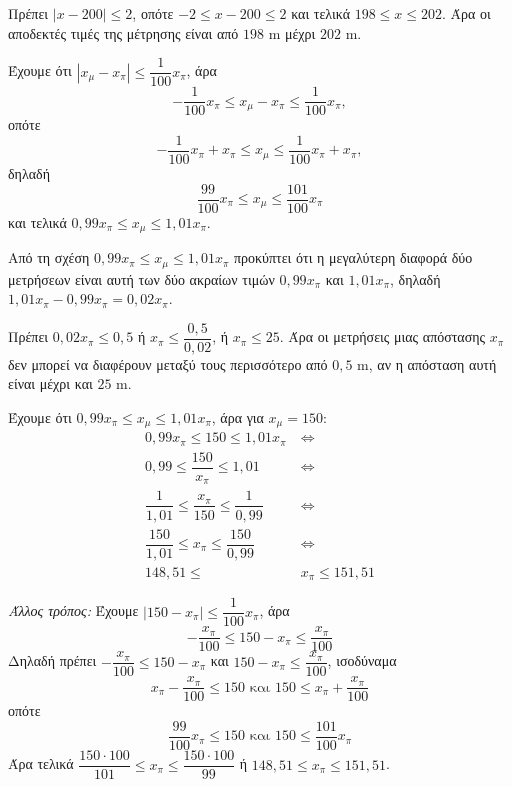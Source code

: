 
\begin{alist}
\item Πρέπει $|x - 200| \le 2$, οπότε $-2 \le x - 200 \le 2$ και τελικά
$198 \le x \le 202$. Άρα οι αποδεκτές τιμές της μέτρησης είναι από $198\text{ m}$ μέχρι $202\text{ m}$.

\item
\begin{rlist}
\item Έχουμε ότι
$|x_\mu - x_\pi| \le \dfrac{1}{100} x_\pi$,
άρα
\[-\dfrac{1}{100} x_\pi \le x_\mu - x_\pi \le \dfrac{1}{100} x_\pi,\]
οπότε
\[-\dfrac{1}{100} x_\pi + x_\pi \le x_\mu \le \dfrac{1}{100} x_\pi + x_\pi,\]
δηλαδή
\[\dfrac{99}{100} x_\pi \le x_\mu \le \dfrac{101}{100} x_\pi\]
και τελικά
$0,99x_\pi \le x_\mu \le 1,01x_\pi$.

\item Από τη σχέση $0,99x_\pi \le x_\mu \le 1,01x_\pi$ προκύπτει ότι η μεγαλύτερη διαφορά δύο μετρήσεων είναι αυτή των δύο ακραίων τιμών $0,99x_\pi$ και $1,01x_\pi$, δηλαδή
$1,01x_\pi - 0,99x_\pi = 0,02x_\pi$.

\item Πρέπει $0,02x_\pi \le 0,5$ ή $x_\pi \le \dfrac{0,5}{0,02}$, ή $x_\pi \le 25$. Άρα οι μετρήσεις μιας απόστασης $x_\pi$ δεν μπορεί να διαφέρουν μεταξύ τους περισσότερο από $0,5\text{ m}$, αν η απόσταση αυτή είναι μέχρι και $25\text{ m}$.
\end{rlist}

\item Έχουμε ότι $0,99x_\pi \le x_\mu \le 1,01x_\pi$, άρα για $x_\mu = 150$:
\begin{align*}
0,99x_\pi \le 150 \le 1,01x_\pi \ &\Leftrightarrow \\
0,99 \le \dfrac{150}{x_\pi} \le 1,01 \ &\Leftrightarrow \\
\dfrac{1}{1,01} \le \dfrac{x_\pi}{150} \le \dfrac{1}{0,99} \ &\Leftrightarrow \\
\dfrac{150}{1,01} \le x_\pi \le \dfrac{150}{0,99} \ &\Leftrightarrow \\
148,51 \le &x_\pi \le 151,51
\end{align*}

\textit{Άλλος τρόπος:}
Έχουμε $|150 - x_\pi| \le \dfrac{1}{100} x_\pi$, άρα
\[-\dfrac{x_\pi}{100} \le 150 - x_\pi \le \dfrac{x_\pi}{100}\]
Δηλαδή πρέπει $-\dfrac{x_\pi}{100} \le 150 - x_\pi$ και $150 - x_\pi \le \dfrac{x_\pi}{100}$, ισοδύναμα
\[x_\pi - \dfrac{x_\pi}{100} \le 150 \text{ και } 150 \le x_\pi + \dfrac{x_\pi}{100}\]
οπότε
\[\dfrac{99}{100}x_\pi \le 150 \text{ και } 150 \le \dfrac{101}{100}x_\pi\]
Άρα τελικά $\dfrac{150 \cdot 100}{101} \le x_\pi \le \dfrac{150 \cdot 100}{99}$ ή $148,51 \le x_\pi \le 151,51$.
\end{alist}

